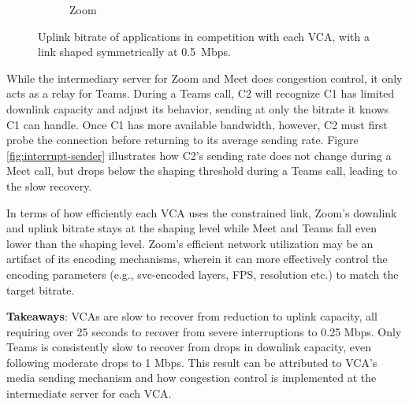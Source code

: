 \begin{figure}[t!]
\begin{subfigure}[t]{.33\textwidth}
        \caption{Zoom}
        \label{fig:zoom_ul_box}
    \end{subfigure}
    \caption{Uplink bitrate of applications in competition with each VCA, with a link shaped symmetrically at 0.5~Mbps.}
    \label{fig:boxplot-upld}
\end{figure}




While the intermediary server for Zoom and Meet does congestion control, it only acts as a relay for Teams. During a Teams call, C2 will recognize C1 has limited downlink capacity and adjust its behavior, sending at only the bitrate it knows C1 can handle. Once C1 has more available bandwidth, however, C2 must first probe the connection before returning to its average sending rate. Figure \ref{fig:interrupt-sender} illustrates how C2's sending rate does not change during a Meet call, but drops below the shaping threshold during a Teams call, leading to the slow recovery.


In terms of how efficiently each VCA uses the constrained link, Zoom's downlink and uplink bitrate stays at the shaping level while Meet and Teams fall even lower than the shaping level. Zoom's efficient network utilization may be an artifact of its encoding mechanisms, wherein it can more effectively control the encoding parameters (e.g., svc-encoded layers, FPS, resolution etc.) to match the target bitrate.  

\begin{mdframed}[roundcorner=5pt, backgroundcolor=black!10]
\noindent \textbf{Takeaways}: VCAs are slow to recover from reduction to uplink capacity, all requiring over 25 seconds to recover from severe interruptions to 0.25 Mbps. Only Teams is consistently slow to recover from drops in downlink capacity, even following moderate drops to 1 Mbps. This result can be attributed to VCA's media sending mechanism and how  congestion control is implemented at the intermediate server for each VCA. 
\end{mdframed}


